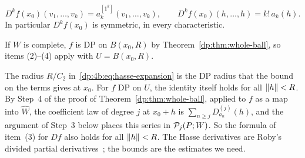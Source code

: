 \begin{theorem}[differentiability]
\begin{enumerate}
\begin{equation}\label{dp:4b:eq:frechet-law}
 D^kf(x_0)(v_1,\dots,v_k)=a_k^{[1^k]}(v_1,\dots,v_k),\qquad D^kf(x_0)(h,\dots,h)=k!\,a_k(h).
\end{equation}
In particular $D^kf(x_0)$ is symmetric, in every characteristic.
\end{enumerate}
If $W$ is complete, $f$ is DP on $B(x_0,R)$ by Theorem~\ref{dp:thm:whole-ball}, so items \textup{(2)--(4)} apply with $U=B(x_0,R)$.
\end{theorem}

The radius $R/C_2$ in~\eqref{dp:4b:eq:hasse-expansion} is the DP radius that the bound on the terms gives at $x_0$. For $f$ DP on $U$, the identity itself holds for all $\lVert h\rVert<R$. By Step~4 of the proof of Theorem~\ref{dp:thm:whole-ball}, applied to $f$ as a map into $\widehat W$, the coefficient law of degree $j$ at $x_0+h$ is $\sum_{n\ge j}D^{(j)}_{a_n}(h)$, and the argument of Step~3 below places this series in $\mathcal P_j(P;W)$. So the formula of item~(3) for $Df$ also holds for all $\lVert h\rVert<R$. The Hasse derivatives are Roby's divided partial derivatives~\cite[II~\S5]{Ro}; the bounds are the estimates we need.

